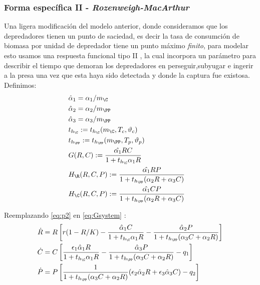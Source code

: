 \subsubsection{Forma espec\'ifica II - \emph{Rozenweigh-MacArthur}}
Una ligera modificaci\'on del modelo anterior, donde consideramos que los depredadores tienen un punto de saciedad, es decir la tasa de consumci\'on de biomasa por unidad de depredador tiene un punto m\'aximo \emph{finito}, para modelar esto usamos una respuesta funcional tipo II \citep{gotelliprimer}, la cual incorpora un par\'ametro para describir el tiempo que demoran los depredadores en perseguir,subyugar e ingerir a la presa una vez que esta haya sido detectada y donde la captura fue existosa\citep{brose2010body}.\\
Definimos:
\begin{equation}\label{eq:p2}
\begin{aligned}
&\hat{\alpha}_1 = \alpha_1/m_\C&\\
&\hat{\alpha}_2 = \alpha_2/m_\PP&\\
&\hat{\alpha}_3 = \alpha_3/m_\PP&\\
&t_{h_\C} := t_{h_{\C}} ( m_\C , T_c, \vartheta_c)\\
&t_{h_\PP} := t_{h_{\PP}} ( m_\PP , T_p, \vartheta_p)\\
&G(R,C):= \frac{\hat{\alpha_1}RC}{1+t_{h_\C}\alpha_1 R} &\\ 
&H_{\R}(R,C,P):= \frac{\hat{\alpha_1}RP}{1+t_{h_\PP}(\alpha_2 R+\alpha_3C)}\\
&H_{\C}(R,C,P):= \frac{\hat{\alpha_1}CP}{1+t_{h_\PP}(\alpha_2 R+\alpha_3C)}
\end{aligned}
\end{equation}

Reemplazando \eqref{eq:p2} en \eqref{eq:Gsystem} :
\begin{equation}
\begin{aligned} 
\dot{R} &= R\left[r(1-R/K)- \frac{\hat{\alpha}_1 C}{1+t_{h_\C} \alpha_1 R} -\frac{\hat{\alpha}_2 P}{1+t_{h_\PP} (\alpha_3C+ \alpha_2R)} \right] \\
\dot{C} &= C \left[\frac{\epsilon_1 \hat{\alpha}_1 R}{1+t_{h_\C}\alpha_1 R} - \frac{\hat{\alpha}_3 P}{1+t_{h_\PP} (\alpha_3C+ \alpha_2R)} - q_1\right] \\
\dot{P} &= P \left[\frac{1}{1+t_{h_\PP} (\alpha_3C+ \alpha_2R)} (\epsilon_2 \hat{\alpha}_2R +\epsilon_3 \hat{\alpha}_3C) - q_2 \right]
\end{aligned}
\end{equation}

